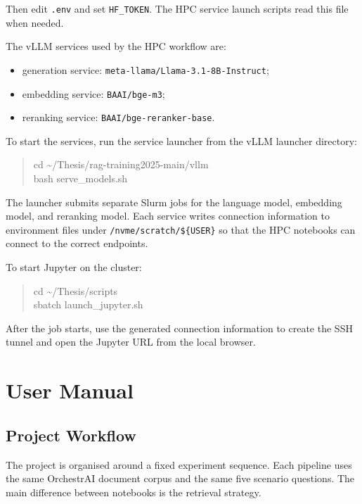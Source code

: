 Then edit \texttt{.env} and set \texttt{HF\_TOKEN}. The \ac{HPC} service launch scripts read this file when needed.

The vLLM services used by the \ac{HPC} workflow are:

\begin{itemize}
    \item generation service: \texttt{meta-llama/Llama-3.1-8B-Instruct};
    \item embedding service: \texttt{BAAI/bge-m3};
    \item reranking service: \texttt{BAAI/bge-reranker-base}.
\end{itemize}

To start the services, run the service launcher from the vLLM launcher directory:

\begin{quote}
\small\ttfamily
cd \textasciitilde/Thesis/rag-training2025-main/vllm\\
bash serve\_models.sh
\end{quote}

The launcher submits separate Slurm jobs for the language model, embedding model, and reranking model. Each service writes connection information to environment files under \texttt{/nvme/scratch/\$\{USER\}} so that the \ac{HPC} notebooks can connect to the correct endpoints.

To start Jupyter on the cluster:

\begin{quote}
\small\ttfamily
cd \textasciitilde/Thesis/scripts\\
sbatch launch\_jupyter.sh
\end{quote}

After the job starts, use the generated connection information to create the SSH tunnel and open the Jupyter URL from the local browser.

\newpage
\section*{User Manual}

\subsection*{Project Workflow}

The project is organised around a fixed experiment sequence. Each pipeline uses the same OrchestrAI document corpus and the same five scenario questions. The main difference between notebooks is the retrieval strategy.

